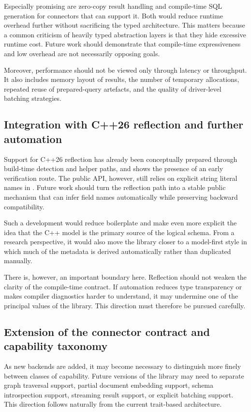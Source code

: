 Especially promising are zero-copy result handling and compile-time SQL generation for connectors that can support it. Both would reduce runtime overhead further without sacrificing the typed architecture. This matters because a common criticism of heavily typed abstraction layers is that they hide excessive runtime cost. Future work should demonstrate that compile-time expressiveness and low overhead are not necessarily opposing goals.

Moreover, performance should not be viewed only through latency or throughput. It also includes memory layout of results, the number of temporary allocations, repeated reuse of prepared-query artefacts, and the quality of driver-level batching strategies.

\subsection{Integration with C++26 reflection and further automation}

Support for C++26 reflection has already been conceptually prepared through build-time detection and helper paths, and  shows the presence of an early verification route. The public API, however, still relies on explicit string literal names in . Future work should turn the reflection path into a stable public mechanism that can infer field names automatically while preserving backward compatibility.

Such a development would reduce boilerplate and make even more explicit the idea that the C++ model is the primary source of the logical schema. From a research perspective, it would also move the library closer to a model-first style in which much of the metadata is derived automatically rather than duplicated manually.

There is, however, an important boundary here. Reflection should not weaken the clarity of the compile-time contract. If automation reduces type transparency or makes compiler diagnostics harder to understand, it may undermine one of the principal values of the library. This direction must therefore be pursued carefully.

\subsection{Extension of the connector contract and capability taxonomy}

As new backends are added, it may become necessary to distinguish more finely between classes of capability. Future versions of the library may need to separate graph traversal support, partial document embedding support, schema introspection support, streaming result support, or explicit batching support. This direction follows naturally from the current trait-based architecture.

